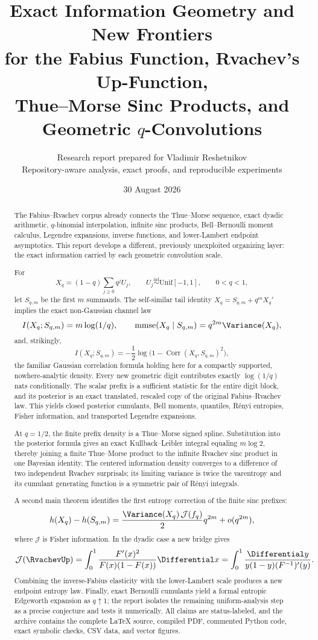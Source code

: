 \documentclass[11pt,oneside]{article}
\title{\bfseries Exact Information Geometry and New Frontiers\\[0.35em]
\Large for the Fabius Function, Rvachev's Up-Function,\\
Thue--Morse Sinc Products, and Geometric $q$-Convolutions}
\author{Research report prepared for Vladimir Reshetnikov\\
\small Repository-aware analysis, exact proofs, and reproducible experiments}
\date{30 August 2026}
\theoremstyle{definition}
\theoremstyle{remark}
\newcommand{\Corr}{\operatorname{Corr}}
\begin{document}
\maketitle

\begin{abstract}
The Fabius--Rvachev corpus already connects the Thue--Morse sequence, exact dyadic
arithmetic, $q$-binomial interpolation, infinite sinc products, Bell--Bernoulli
moment calculus, Legendre expansions, inverse functions, and lower-Lambert
endpoint asymptotics.  This report develops a different, previously unexploited
organizing layer: the exact information carried by each geometric convolution
scale.

For
\[
 X_q=(1-q)\sum_{j\ge0}q^jU_j,
 \qquad U_j\stackrel{\mathrm{iid}}\sim\mathrm{Unif}[-1,1],
 \qquad 0<q<1,
\]
let $S_{q,m}$ be the first $m$ summands.  The self-similar tail identity
$X_q=S_{q,m}+q^mX_q'$ implies the exact non-Gaussian channel law
\[
 I(X_q;S_{q,m})=m\log(1/q),
 \qquad
 \operatorname{mmse}(X_q\mid S_{q,m})=q^{2m}\Variance(X_q),
\]
and, strikingly,
\[
 I(X_q;S_{q,m})=-\frac12\log\!\bigl(1-\Corr(X_q,S_{q,m})^2\bigr),
\]
the familiar Gaussian correlation formula holding here for a compactly supported,
nowhere-analytic density.  Every new geometric digit contributes exactly
$\log(1/q)$ nats conditionally.  The scalar prefix is a sufficient statistic for
the entire digit block, and its posterior is an exact translated, rescaled copy of
the original Fabius--Rvachev law.  This yields closed posterior cumulants, Bell
moments, quantiles, R\'enyi entropies, Fisher information, and transported
Legendre expansions.

At $q=1/2$, the finite prefix density is a Thue--Morse signed spline.  Substitution
into the posterior formula gives an exact Kullback--Leibler integral equaling
$m\log2$, thereby joining a finite Thue--Morse product to the infinite Rvachev
sinc product in one Bayesian identity.  The centered information density converges
to a difference of two independent Rvachev surprisals; its limiting variance is
twice the varentropy and its cumulant generating function is a symmetric pair of
R\'enyi integrals.

A second main theorem identifies the first entropy correction of the finite sinc
prefixes:
\[
 h(X_q)-h(S_{q,m})
 =\frac{\Variance(X_q)\,\mathcal J(f_q)}2q^{2m}
  +o(q^{2m}),
\]
where $\mathcal J$ is Fisher information.  In the dyadic case a new bridge gives
\[
 \mathcal J(\RvachevUp)
 =\int_0^1\frac{F'(x)^2}{F(x)(1-F(x))}\Differential x
 =\int_0^1\frac{\Differential y}{y(1-y)(F^{-1})'(y)}.
\]
Combining the inverse-Fabius elasticity with the lower-Lambert scale produces a
new endpoint entropy law.  Finally, exact Bernoulli cumulants yield a formal
entropic Edgeworth expansion as $q\uparrow1$; the report isolates the remaining
uniform-analysis step as a precise conjecture and tests it numerically.  All
claims are status-labeled, and the archive contains the complete LaTeX source,
compiled PDF, commented Python code, exact symbolic checks, CSV data, and vector
figures.
\end{abstract}
\end{document}
